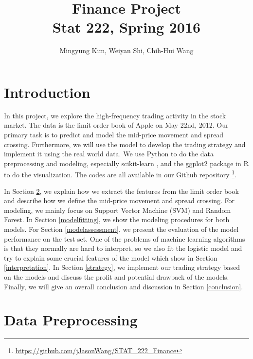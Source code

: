 \documentclass[11pt]{article}
\title{Finance Project\\
  Stat 222, Spring 2016}
\author{
  Mingyung Kim, Weiyan Shi, Chih-Hui Wang
  \\
  \texttt{}
}
\begin{document}
\maketitle




\section{Introduction}
In this project, we explore the high-frequency trading activity in the stock market. The data is the limit order book of Apple on May 22nd, 2012. Our primary task is to predict and model the mid-price movement and spread crossing. Furthermore, we will use the model to develop the trading strategy and implement it using the real world data. We use Python to do the data preprocessing and modeling, especially scikit-learn \cite{scikit-learn}, and the ggplot2 package in R to do the visualization. The codes are all available in our Github repository \footnote{\url{https://github.com/jJasonWang/STAT_222_Finance}}.

In Section \ref{DataPreprocessing}, we explain how we extract the features from the limit order book and describe how we define the mid-price movement and spread crossing. For modeling, we mainly focus on Support Vector Machine (SVM) and Random Forest. In Section \ref{modelfitting}, we show the modeling procedures for both models. For Section \ref{modelassessment}, we present the evaluation of the model performance on the test set. One of the problems of machine learning algorithms is that they normally are hard to interpret, so we also fit the logistic model and try to explain some crucial features of the model which show in Section \ref{interpretation}. In Section \ref{strategy}, we implement our trading strategy based on the models and discuss the profit and potential drawback of the models. Finally, we will give an overall conclusion and discussion in Section \ref{conclusion}.



\section{Data Preprocessing} \label{DataPreprocessing}
\end{document}
